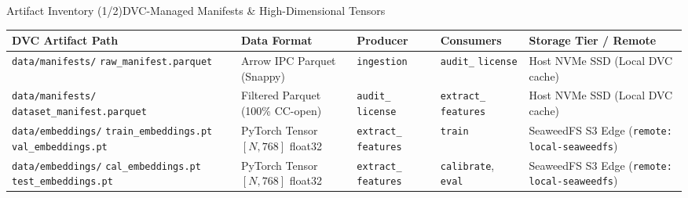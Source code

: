 \begin{frame}{Artifact Inventory (1/2)}{DVC-Managed Manifests \& High-Dimensional Tensors}
    \vspace{-0.2cm}
    \begin{center}\scriptsize\renewcommand{\arraystretch}{0.80}
        \begin{tabular}{>{\raggedright\arraybackslash}p{3.6cm} >{\raggedright\arraybackslash}p{2.3cm} >{\raggedright\arraybackslash}p{1.4cm} >{\raggedright\arraybackslash}p{1.5cm} >{\raggedright\arraybackslash}p{2.5cm}}
            \toprule
            \textbf{DVC Artifact Path} & \textbf{Data Format} & \textbf{Producer} & \textbf{Consumers} & \textbf{Storage Tier / Remote} \\
            \midrule
            \texttt{data/manifests/} \newline \texttt{raw\_manifest.parquet} & Arrow IPC \newline Parquet (Snappy) & \texttt{ingestion} & \texttt{audit\_} \newline \texttt{license} & Host NVMe SSD \newline (Local DVC cache) \\
            \midrule
            \texttt{data/manifests/} \newline \texttt{dataset\_manifest.parquet} & Filtered Parquet \newline (100\% CC-open) & \texttt{audit\_} \newline \texttt{license} & \texttt{extract\_} \newline \texttt{features} & Host NVMe SSD \newline (Local DVC cache) \\
            \midrule
            \texttt{data/embeddings/} \newline \texttt{train\_embeddings.pt} \newline \texttt{val\_embeddings.pt} & PyTorch Tensor \newline $[N, 768]$ float32 & \texttt{extract\_} \newline \texttt{features} & \texttt{train} & SeaweedFS S3 Edge \newline (\texttt{remote: local-seaweedfs}) \\
            \midrule
            \texttt{data/embeddings/} \newline \texttt{cal\_embeddings.pt} \newline \texttt{test\_embeddings.pt} & PyTorch Tensor \newline $[N, 768]$ float32 & \texttt{extract\_} \newline \texttt{features} & \texttt{calibrate}, \newline \texttt{eval} & SeaweedFS S3 Edge \newline (\texttt{remote: local-seaweedfs}) \\
            \bottomrule
        \end{tabular}
    \end{center}


\end{frame}
